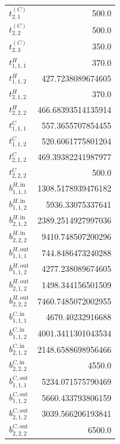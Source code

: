 \documentclass{article}%
\begin{document}
\begin{multicols*}{3}
\begin{supertabular}{lr}
	$t_{2,1}^{(C)}$ & 500.0 \\%
	$t_{2,2}^{(C)}$ & 500.0 \\%
	$t_{2,3}^{(C)}$ & 350.0 \\%
	$t_{1,1,1}^{H}$ & 370.0 \\%
	$t_{1,1,2}^{H}$ & 427.7238089674605 \\%
	$t_{2,1,2}^{H}$ & 370.0 \\%
	$t_{2,2,2}^{H}$ & 466.68393514135914 \\%
	$t_{1,1,1}^{C}$ & 557.3655707854455 \\%
	$t_{1,1,2}^{C}$ & 520.6061775801204 \\%
	$t_{2,1,2}^{C}$ & 469.39382241987977 \\%
	$t_{2,2,2}^{C}$ & 500.0 \\%
	$b_{1,1,1}^{H,\text{in}}$ & 1308.5178939476182 \\%
	$b_{1,1,2}^{H,\text{in}}$ & 5936.33075337641 \\%
	$b_{2,1,2}^{H,\text{in}}$ & 2389.2514927997036 \\%
	$b_{2,2,2}^{H,\text{in}}$ & 9410.748507200296 \\%
	$b_{1,1,1}^{H,\text{out}}$ & 744.8486473240288 \\%
	$b_{1,1,2}^{H,\text{out}}$ & 4277.238089674605 \\%
	$b_{2,1,2}^{H,\text{out}}$ & 1498.344156501509 \\%
	$b_{2,2,2}^{H,\text{out}}$ & 7460.7485072002955 \\%
	$b_{1,1,1}^{C,\text{in}}$ & 4670.40232916688 \\%
	$b_{1,1,2}^{C,\text{in}}$ & 4001.3411301043534 \\%
	$b_{2,1,2}^{C,\text{in}}$ & 2148.6588698956466 \\%
	$b_{2,2,2}^{C,\text{in}}$ & 4550.0 \\%
	$b_{1,1,1}^{C,\text{out}}$ & 5234.071575790469 \\%
	$b_{1,1,2}^{C,\text{out}}$ & 5660.433793806159 \\%
	$b_{2,1,2}^{C,\text{out}}$ & 3039.566206193841 \\%
	$b_{2,2,2}^{C,\text{out}}$ & 6500.0 \\%
\end{supertabular}%
\end{multicols*}%
\clearpage%
\end{document}
